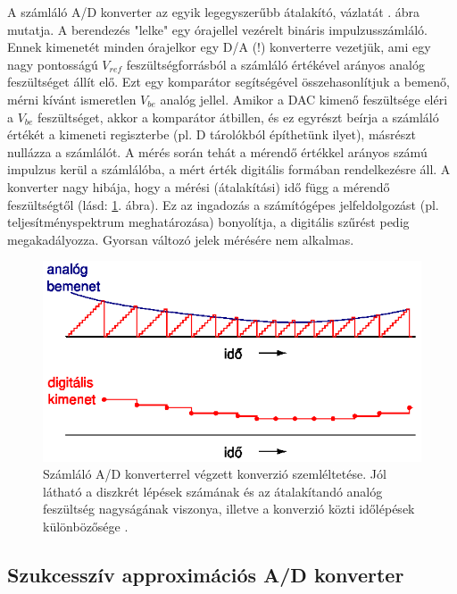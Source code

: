 \documentclass[12pt]{article}
\theoremstyle{plain}
\begin{document}
A számláló A/D konverter az egyik legegyszerűbb átalakító, vázlatát . ábra mutatja. A berendezés "lelke" egy órajellel vezérelt bináris impulzusszámláló. Ennek kimenetét minden órajelkor egy D/A (!) konverterre vezetjük, ami egy nagy pontosságú $V_{ref}$ feszültségforrásból a számláló értékével arányos analóg feszültséget állít elő. Ezt egy komparátor segítségével összehasonlítjuk a bemenő, mérni kívánt ismeretlen $V_{be}$ analóg jellel. Amikor a DAC kimenő feszültsége eléri a $V_{be}$ feszültséget, akkor a komparátor átbillen, és ez egyrészt beírja a számláló értékét a kimeneti regiszterbe (pl. D tárolókból építhetünk ilyet), másrészt nullázza a számlálót. A mérés során tehát a mérendő értékkel arányos számú impulzus kerül a számlálóba, a mért érték digitális formában rendelkezésre áll. 
A konverter nagy hibája, hogy a mérési (átalakítási) idő függ a mérendő feszültségtől (lásd: \ref{fig:adcszamlalojel}. ábra). Ez az ingadozás a számítógépes jelfeldolgozást (pl. teljesítményspektrum meghatározása) bonyolítja, a digitális szűrést pedig megakadályozza. Gyorsan változó jelek mérésére nem alkalmas.


\begin{figure}[H]
	\centering
	\includegraphics[width=0.7\linewidth]{media/ADC_szamlalo_jel}
	\caption{Számláló A/D konverterrel végzett konverzió szemléltetése. Jól látható a diszkrét lépések számának és az átalakítandó analóg feszültség nagyságának viszonya, illetve a konverzió közti időlépések különbözősége \cite{Bagoly}.}
	\label{fig:adcszamlalojel}
\end{figure}


\subsection{Szukcesszív approximációs A/D konverter \cite{Bagoly}}
\end{document}

